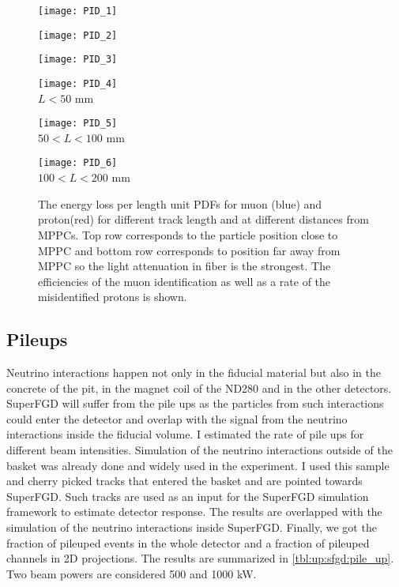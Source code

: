 \documentclass[main.tex]{subfiles}
\begin{document}
\begin{figure}[!ht]
	\centering
	\begin{minipage}{0.25\linewidth}
		\centering
		\texttt{[image: PID\_1]}
	\end{minipage}
	\begin{minipage}{0.25\linewidth}
		\centering
		\texttt{[image: PID\_2]}
	\end{minipage}
	\begin{minipage}{0.25\linewidth}
		\centering
		\texttt{[image: PID\_3]}
	\end{minipage}
	\hfill
	\begin{minipage}{0.25\linewidth}
		\centering
		\texttt{[image: PID\_4]} \\ $ L < 50$ mm
	\end{minipage}
	\begin{minipage}{0.25\linewidth}
		\centering
		\texttt{[image: PID\_5]} \\ $50 < L < 100$ mm
	\end{minipage}
	\begin{minipage}{0.25\linewidth}
		\centering
		\texttt{[image: PID\_6]} \\  $100 < L < 200$ mm
	\end{minipage}
	\caption{The energy loss per length unit PDFs for muon (blue) and proton(red) for different track length and at different distances from MPPCs. Top row corresponds to the particle position close to MPPC and bottom row corresponds to position far away from MPPC so the light attenuation in fiber is the strongest. The efficiencies of the muon identification as well as a rate of the misidentified protons is shown.}
	\label{fig:up:sfgd:pid}
\end{figure}

\subsection{Pileups}
\label{sec:up:sfgd:pu}
Neutrino interactions happen not only in the fiducial material but also in the concrete of the pit, in the magnet coil of the ND280 and in the other detectors. SuperFGD will suffer from the pile ups as the particles from such interactions could enter the detector and overlap with the signal from the neutrino interactions inside the fiducial volume. I estimated the rate of pile ups for different beam intensities. Simulation of the neutrino interactions outside of the basket was already done and widely used in the experiment. I used this sample and cherry picked tracks that entered the basket and are pointed towards SuperFGD. Such tracks are used as an input for the SuperFGD simulation framework to estimate detector response. The results are overlapped with the simulation of the neutrino interactions inside SuperFGD. Finally, we got the fraction of pileuped events in the whole detector and a fraction of pileuped channels in 2D projections. The results are summarized in \autoref{tbl:up:sfgd:pile_up}. Two beam powers are considered 500 and 1000 kW.
\end{document}
